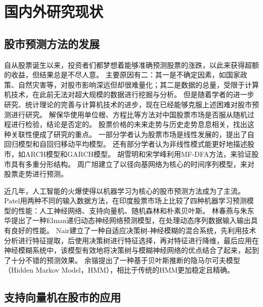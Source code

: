 \section{国内外研究现状}

\subsection{股市预测方法的发展}

自从股票诞生以来，投资者们都梦想着能够准确预测股票的涨跌，以此来获得超额的收益，但结果总是不尽人意。
主要原因有二：其一是不确定因素，如国家政策\cite{cn5}、自然灾害等，对股市影响深远但却很难量化；其二是数据的总量，受限于计算机技术，在此前无法对超大规模的数据进行挖掘与分析。
但是随着学者的进一步研究、统计理论的完善与计算机技术的进步，现在已经能够克服上述困难对股市预测进行研究。
解保华使用单位根、方程比等方法对中国股票市场是否服从随机过程进行检验，结论是否定的\cite{cn6}。
股票价格的未来走势与历史走势息息相关，找出这种关联性便成了研究的重点。
一部分学者认为股票市场是线性发展的，提出了自回归模型\cite{cn7}和自回归移动平均模型\cite{cn8}。
还有部分学者认为非线性模式能更好地描述股市，如ARCH模型\cite{cn9}和GARCH模型\cite{cn10}。
胡雪明和宋学峰利用MF-DFA方法，来验证股市具有多重分形结构\cite{cn11}。
周广旭建立了以径向基网络为核心的时间序列模型，来对股票走势进行预测\cite{cn12}。

近几年，人工智能的火爆使得以机器学习为核心的股市预测方法成为了主流\cite{cn13}。
Patel用两种不同的输入数据方法，在印度股票市场上比较了四种机器学习预测模型的性能：人工神经网络、支持向量机、随机森林和朴素贝叶斯\cite{en2}。
林春燕与朱东华提出了一种Elman递归动态神经网络预测模型，在处理动态序列数据输入输出具有良好的性能\cite{cn14}。
Nair建立了一种自适应决策树-神经模糊的混合系统，先利用技术分析进行特征提取，后使用决策树进行特征选择，再对特征进行降维，最后应用在神经模糊系统中，该模型有效地将决策树与模糊神经网络的优点结合了起来，起到了十分不错的预测效果\cite{en3}。
余锴提出了一种基于贝叶斯推断的隐马尔可夫模型（Hidden Markov Model，HMM），相比于传统的HMM更加稳定且精确\cite{cn15}。

\subsection{支持向量机在股市的应用}

